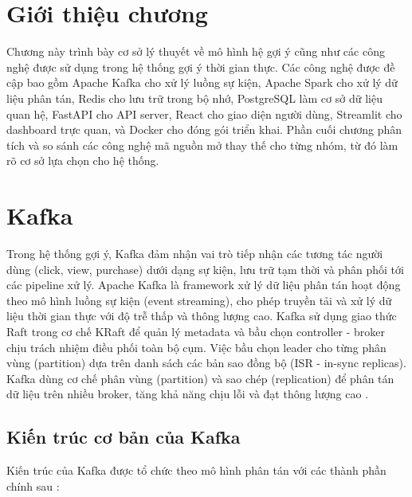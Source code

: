 \documentclass[../BTL.tex]{subfiles}
\begin{document}
\section*{Giới thiệu chương}
Chương này trình bày cơ sở lý thuyết về mô hình hệ gợi ý cũng như các công nghệ được sử dụng trong hệ thống gợi ý thời gian thực. Các công nghệ được đề cập bao gồm Apache Kafka cho xử lý luồng sự kiện, Apache Spark cho xử lý dữ liệu phân tán, Redis cho lưu trữ trong bộ nhớ, PostgreSQL làm cơ sở dữ liệu quan hệ, FastAPI cho API server, React cho giao diện người dùng, Streamlit cho dashboard trực quan, và Docker cho đóng gói triển khai. Phần cuối chương phân tích và so sánh các công nghệ mã nguồn mở thay thế cho từng nhóm, từ đó làm rõ cơ sở lựa chọn cho hệ thống.

\section{Kafka}
Trong hệ thống gợi ý, Kafka đảm nhận vai trò tiếp nhận các tương tác người dùng (click, view, purchase) dưới dạng sự kiện, lưu trữ tạm thời và phân phối tới các pipeline xử lý. Apache Kafka là framework xử lý dữ liệu phân tán hoạt động theo mô hình luồng sự kiện (event streaming), cho phép truyền tải và xử lý dữ liệu thời gian thực với độ trễ thấp và thông lượng cao. Kafka sử dụng giao thức Raft trong cơ chế KRaft \cite{kafka_internals} để quản lý metadata và bầu chọn controller - broker chịu trách nhiệm điều phối toàn bộ cụm. Việc bầu chọn leader cho từng phân vùng (partition) dựa trên danh sách các bản sao đồng bộ (ISR - in-sync replicas). Kafka dùng cơ chế phân vùng (partition) và sao chép (replication) để phân tán dữ liệu trên nhiều broker, tăng khả năng chịu lỗi và đạt thông lượng cao \cite{kafka_design}.

\subsection{Kiến trúc cơ bản của Kafka}
Kiến trúc của Kafka được tổ chức theo mô hình phân tán với các thành phần chính sau \cite{kafka_official,streaming_systems}:
\end{document}
